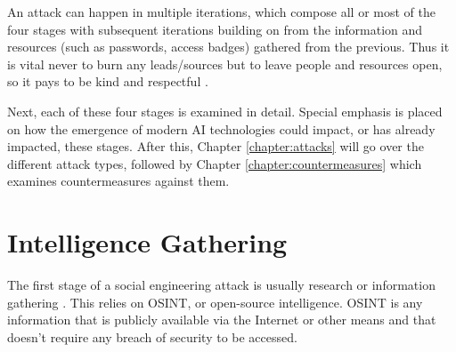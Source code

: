 An attack can happen in multiple iterations, which compose all or most of the four stages with subsequent iterations building on from the information and resources (such as passwords, access badges) gathered from the previous. Thus it is vital never to burn any leads/sources but to leave people and resources open, so it pays to be kind and respectful \citep{hadnagySocialEngineering2018}.

Next, each of these four stages is examined in detail. Special emphasis is placed on how the emergence of modern AI technologies could impact, or has already impacted, these stages. After this, Chapter \ref{chapter:attacks} will go over the different attack types, followed by Chapter \ref{chapter:countermeasures} which examines countermeasures against them.






\section{Intelligence Gathering}
\begin{comment}
    
    - OSINT has been defined in a preceending chapter
    - Cover the phase of intel gathering more broadly than just OSINT
    - Following and observing people entering and exiting premises
    - Calling the company for more information (after OSINT)
    - Use of pretexting in intel gathering
    - Gather info, understand vulnerabilities, habits, potential entry/exit points
    - Company website, social media profiles (inlc. old), public info e.g. from corporate databases (YTJ)
    - Physical surveillance of targets
    - AI can augment data collection and analysis (inc big amounts of data), increases speed of intel gathering and the attack itself
    - NLP may help in parsing the info

\end{comment}


The first stage of a social engineering attack is usually research or information gathering \citep{krombholzAdvancedSocialEngineeringAttacks2015}. This relies on OSINT, or open-source intelligence. OSINT is any information that is publicly available via the Internet or other means and that doesn't require any breach of security to be accessed.


